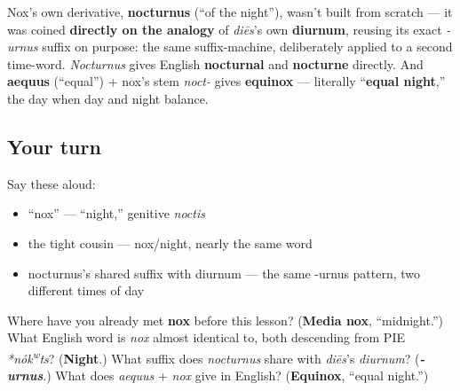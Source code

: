 \begin{grammarlens}[title={Grammar Lens: The same suffix as diurnum, and a name for equal nights}]
Nox's own derivative, \textbf{nocturnus} (\textquotedblleft{}of the night\textquotedblright{}), wasn't built from scratch — it was coined \textbf{directly on the analogy} of \emph{diēs}'s own \textbf{diurnum}, reusing its exact \emph{-urnus} suffix on purpose: the same suffix-machine, deliberately applied to a second time-word. \emph{Nocturnus} gives English \textbf{nocturnal} and \textbf{nocturne} directly. And \textbf{aequus} (\textquotedblleft{}equal\textquotedblright{}) + nox's stem \emph{noct-} gives \textbf{equinox} — literally \textquotedblleft{}\textbf{equal night},\textquotedblright{} the day when day and night balance.
\end{grammarlens}

\subsection*{Your turn}
Say these aloud:

\begin{itemize}
\raggedright
  \item \textquotedblleft{}nox\textquotedblright{} — \textquotedblleft{}night,\textquotedblright{} genitive \emph{noctis}
  \item the tight cousin — nox/night, nearly the same word
  \item nocturnus's shared suffix with diurnum — the same -urnus pattern, two different times of day
\end{itemize}

\begin{tcolorbox}[breakable,colback=teal!4,colframe=teal!35!black,title={Before you move on}]
Where have you already met \textbf{nox} before this lesson? (\textbf{Media nox}, \textquotedblleft{}midnight.\textquotedblright{}) What English word is \emph{nox} almost identical to, both descending from PIE \emph{*nók\textsuperscript{w}ts}? (\textbf{Night}.) What suffix does \emph{nocturnus} share with \emph{diēs}'s \emph{diurnum}? (\emph{\textbf{-urnus}}.) What does \emph{aequus} + \emph{nox} give in English? (\textbf{Equinox}, \textquotedblleft{}equal night.\textquotedblright{})
\end{tcolorbox}
